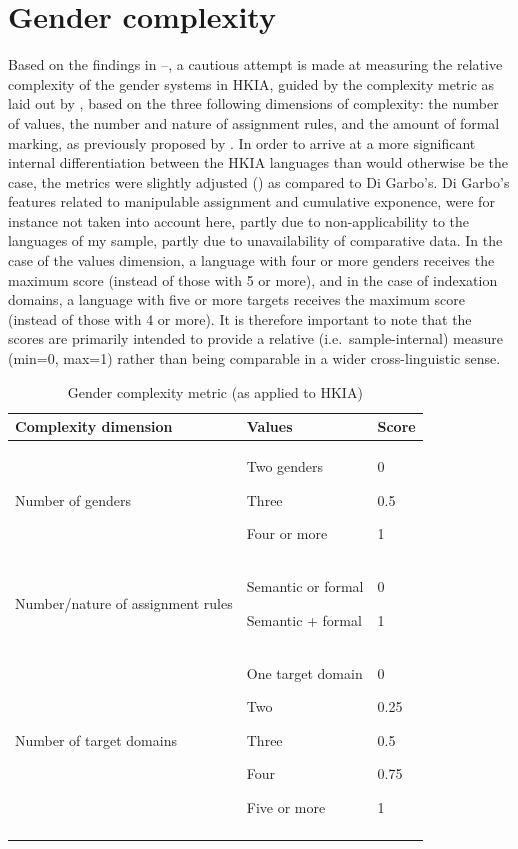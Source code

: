 \documentclass[output=collectionpaper]{langsci/langscibook}
\begin{document}
\section{Gender complexity}

Based on the findings in --, a cautious attempt is made at measuring the relative complexity of the gender systems in HKIA, guided by the complexity metric as laid out by \citet{DiGarbo2016}, based on the three following dimensions of complexity: the number of values, the number and nature of assignment rules, and the amount of formal marking, as previously proposed by \citet{Audring2014}. In order to arrive at a more significant internal differentiation between the HKIA languages than would otherwise be the case, the metrics were slightly adjusted () as compared to Di Garbo's. Di Garbo's features related to manipulable assignment and cumulative exponence, were for instance not taken into account here, partly due to non-applicability to the languages of my sample, partly due to unavailability of comparative data. In the case of the values dimension, a language with four or more genders receives the maximum score (instead of those with 5 or more), and in the case of indexation domains, a language with five or more targets receives the maximum score (instead of those with 4 or more). It is therefore important to note that the scores are primarily intended to provide a relative (i.e.\ sample-internal) measure (min=0, max=1) rather than being comparable in a wider cross-linguistic sense.


\begin{table}[htb]
\begin{tabularx}{0.9\textwidth}{Xp{3cm}p{1cm}}
\lsptoprule
Complexity dimension & Values & Score\\
\midrule
Number of genders & Two genders

Three

Four or more & 0

0.5

1\\
Number/nature of assignment rules & Semantic or formal

Semantic + formal & 0

1\\
Number of target domains & One target domain

Two

Three

Four

Five or more & 0

0.25

0.5

0.75

1\\
\lspbottomrule
\end{tabularx}
\caption{Gender complexity metric (as applied to HKIA)}
\label{tab:Lilje:12}
\end{table}
\end{document}
